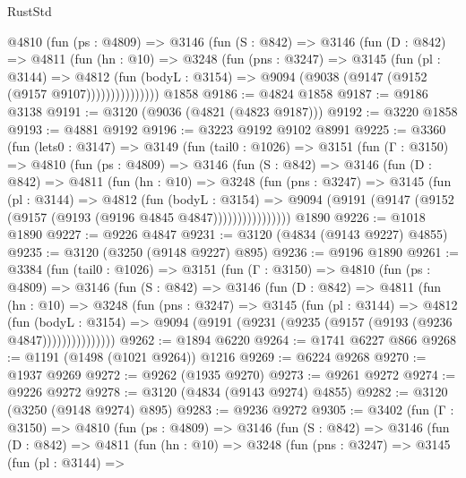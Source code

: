 \begin{lexlean}{RustStd}
\begin{coremodule}
{\begin{coremodule}
{{{{{{{{{{{{{{{{{{{{{{{{{{          @4810
            (fun (ps : @4809) =>
            @3146
              (fun (S : @842) =>
              @3146
                (fun (D : @842) =>
                @4811
                  (fun (hn : @10) =>
                  @3248
                    (fun (pns : @3247) =>
                    @3145
                      (fun (pl : @3144) =>
                      @4812
                        (fun (bodyL : @3154) =>
                        @9094 (@9038 (@9147 (@9152 (@9157 @9107)))))))))))))))
    @1858
@9186 := @4824 @1858
@9187 := @9186 @3138
@9191 := @3120 (@9036 (@4821 (@4823 @9187)))
@9192 := @3220 @1858
@9193 := @4881 @9192
@9196 := @3223 @9192 @9102 @8991
@9225 := @3360
    (fun (lets0 : @3147) =>
    @3149
      (fun (tail0 : @1026) =>
      @3151
        (fun (Γ : @3150) =>
        @4810
          (fun (ps : @4809) =>
          @3146
            (fun (S : @842) =>
            @3146
              (fun (D : @842) =>
              @4811
                (fun (hn : @10) =>
                @3248
                  (fun (pns : @3247) =>
                  @3145
                    (fun (pl : @3144) =>
                    @4812
                      (fun (bodyL : @3154) =>
                      @9094 (@9191 (@9147 (@9152 (@9157 (@9193 (@9196 @4845 @4847))))))))))))))))
    @1890
@9226 := @1018 @1890
@9227 := @9226 @4847
@9231 := @3120 (@4834 (@9143 @9227) @4855)
@9235 := @3120 (@3250 (@9148 @9227) @895)
@9236 := @9196 @1890
@9261 := @3384
    (fun (tail0 : @1026) =>
    @3151
      (fun (Γ : @3150) =>
      @4810
        (fun (ps : @4809) =>
        @3146
          (fun (S : @842) =>
          @3146
            (fun (D : @842) =>
            @4811
              (fun (hn : @10) =>
              @3248
                (fun (pns : @3247) =>
                @3145
                  (fun (pl : @3144) =>
                  @4812
                    (fun (bodyL : @3154) =>
                    @9094 (@9191 (@9231 (@9235 (@9157 (@9193 (@9236 @4847)))))))))))))))
@9262 := @1894 @6220
@9264 := @1741 @6227 @866
@9268 := @1191 (@1498 (@1021 @9264)) @1216
@9269 := @6224 @9268
@9270 := @1937 @9269
@9272 := @9262 (@1935 @9270)
@9273 := @9261 @9272
@9274 := @9226 @9272
@9278 := @3120 (@4834 (@9143 @9274) @4855)
@9282 := @3120 (@3250 (@9148 @9274) @895)
@9283 := @9236 @9272
@9305 := @3402
    (fun (Γ : @3150) =>
    @4810
      (fun (ps : @4809) =>
      @3146
        (fun (S : @842) =>
        @3146
          (fun (D : @842) =>
          @4811
            (fun (hn : @10) =>
            @3248
              (fun (pns : @3247) =>
              @3145
                (fun (pl : @3144) =>
}}}}}}}}}}}}}}}}}}}}}}}}}}
\end{coremodule}}
\end{coremodule}
\end{lexlean}

